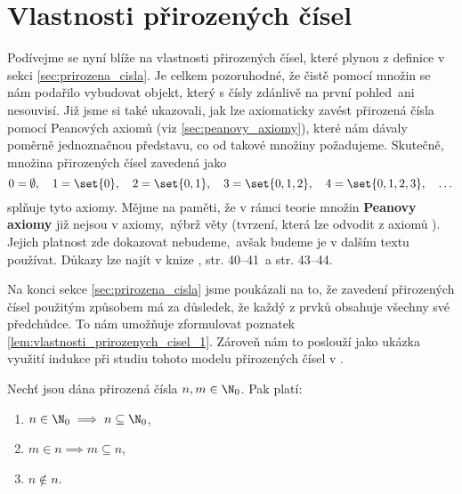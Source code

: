 \section{Vlastnosti přirozených čísel}\label{sec:vlastnosti_prirozenych_cisel}
Podívejme se nyní blíže na vlastnosti přirozených čísel, které plynou z definice v sekci \ref{sec:prirozena_cisla}. Je celkem pozoruhodné, že čistě pomocí množin se nám podařilo vybudovat objekt, který s čísly zdánlivě na první pohled~ani nesouvisí. Již jsme si také ukazovali, jak lze axiomaticky zavést přirozená čísla pomocí Peanových axiomů (viz \ref{sec:peanovy_axiomy}), které nám dávaly poměrně jednoznačnou představu, co od takové množiny požadujeme. Skutečně, množina přirozených čísel zavedená jako
\begin{equation*}
    0=\emptyset,\quad 1=\set{0},\quad 2=\set{0,1},\quad 3=\set{0,1,2},\quad 4=\set{0,1,2,3},\quad\dots
\end{equation*}
splňuje tyto axiomy. Mějme na paměti, že v rámci teorie množin \textbf{Peanovy axiomy} již nejsou v \ZF{} axiomy,~nýbrž věty (tvrzení, která lze odvodit z axiomů \ZF{}). Jejich platnost zde dokazovat nebudeme,~avšak budeme je v dalším textu používat. Důkazy lze najít v knize \cite{Goldrei2017}, str. 40--41~a str. 43--44.\par
Na konci sekce \ref{sec:prirozena_cisla} jsme poukázali na to, že zavedení přirozených čísel použitým způsobem má za důsledek, že každý z prvků obsahuje všechny své předchůdce.
To nám umožňuje zformulovat poznatek \ref{lem:vlastnosti_prirozenych_cisel_1}. Zároveň nám to poslouží jako ukázka využití indukce při studiu tohoto modelu přirozených čísel v \ZF{}.
\begin{lemma}\label{lem:vlastnosti_prirozenych_cisel_1}
    Nechť jsou dána přirozená čísla $n,m\in\N_0$. Pak platí:
    \begin{enumerate}[label=(\roman*)]
        \item\label{item:vlastnost_1_1} $n\in\N_0\implies n\subseteq\N_0$,
        \item\label{item:vlastnost_1_2} $m\in n\implies m\subseteq n$,
        \item\label{item:vlastnost_1_3} $n\notin n$.
    \end{enumerate}
\end{lemma}
